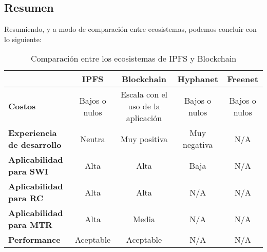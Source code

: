 \subsection{Resumen}

Resumiendo, y a modo de comparación entre ecosistemas, podemos concluir con lo siguiente:


\setlength\tabcolsep{2pt}
\begin{table}[H]
    \centering
    \begin{tabular}{|m{7em}|c|c|c|c|}
    \hline
      & \textbf{IPFS} & \textbf{Blockchain} & \textbf{Hyphanet} & \textbf{Freenet} \\
    \hline
    \textbf{Costos} & Bajos o nulos & Escala con el uso de la aplicación & Bajos o nulos & Bajos o nulos \\
    \hline
    \textbf{Experiencia de desarrollo} & Neutra & Muy positiva & Muy negativa & N/A \\
    \hline
    \textbf{Aplicabilidad para SWI} & Alta & Alta & Baja & N/A \\
    \hline
    \textbf{Aplicabilidad para RC} & Alta & Alta & N/A & N/A \\
    \hline
    \textbf{Aplicabilidad para MTR} & Alta & Media & N/A & N/A \\
    \hline
    \textbf{Performance} & Aceptable & Aceptable & N/A & N/A \\
    \hline
    \end{tabular}
    \caption{Comparación entre los ecosistemas de IPFS y Blockchain}
\end{table}

